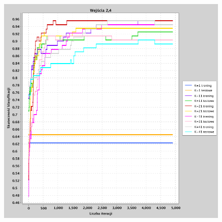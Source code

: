 \documentclass[a4paper, portrait,11pt]{article}
\begin{document}
\begin{figure}[!htb]
\begin{minipage}{0.33\textwidth}
    \caption{\label{fig:41_2_2,3}}
  \end{minipage}
  \begin{minipage}{0.33\textwidth}
    \centering
    \includegraphics[width=1\linewidth]{../data/classification4/1/2_2,4.png}
    \caption{\label{fig:41_2_2,4}}
  \end{minipage}\hfill
\end{figure}
\end{document}
